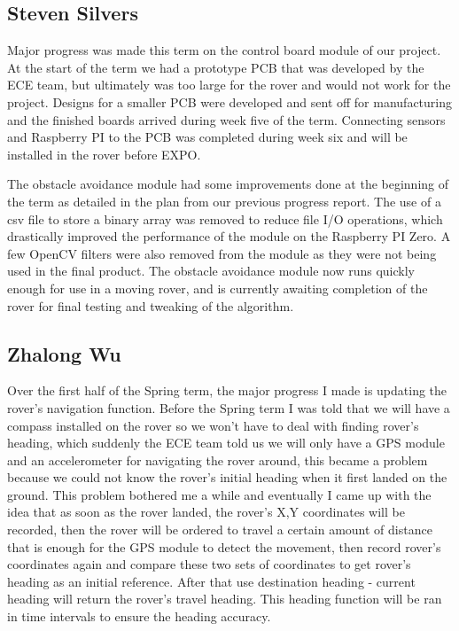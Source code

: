 \documentclass[10pt,letterpaper,onecolumn,draftclsnofoot,journal]{IEEEtran}
\begin{document}
\subsection{\textbf{Steven Silvers}}
Major progress was made this term on the control board module of our project. At the start of the term we had a prototype PCB that was developed by the ECE team, but ultimately was too large for the rover and would not work for the project. Designs for a smaller PCB were developed and sent off for manufacturing and the finished boards arrived during week five of the term. Connecting sensors and Raspberry PI to the PCB was completed during week six and will be installed in the rover before EXPO.\vspace{.3cm}
\par 
The obstacle avoidance module had some improvements done at the beginning of the term as detailed in the plan from our previous progress report. The use of a csv file to store a binary array was removed to reduce file I/O operations, which drastically improved the performance of the module on the Raspberry PI Zero. A few OpenCV filters were also removed from the module as they were not being used in the final product. The obstacle avoidance module now runs quickly enough for use in a moving rover, and is currently awaiting completion of the rover for final testing and tweaking of the algorithm.

\subsection{\textbf{Zhalong Wu}}
Over the first half of the Spring term, the major progress I made is updating the rover's navigation function. Before the Spring term I was told that we will have a compass installed on the rover so we won't have to deal with finding rover's heading, which suddenly the ECE team told us we will only have a GPS module and an accelerometer for navigating the rover around, this became a problem because we could not know the rover's initial heading when it first landed on the ground. This problem bothered me a while and eventually I came up with the idea that as soon as the rover landed, the rover's X,Y coordinates will be recorded, then the rover will be ordered to travel a certain amount of distance that is enough for the GPS module to detect the movement, then record rover's coordinates again and compare these two sets of coordinates to get rover's heading as an initial reference. After that use destination heading - current heading will return the rover's travel heading. This heading function will be ran in time intervals to ensure the heading accuracy. 
\par
\vspace{.3cm}
\end{document}
